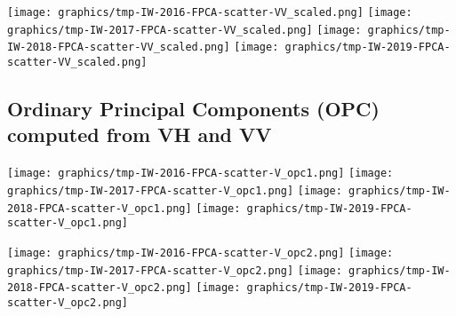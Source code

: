 
\clearpage
\begin{center}
\begin{minipage}{7.0in}
\texttt{[image: graphics/tmp-IW-2016-FPCA-scatter-VV\_scaled.png]}
\quad
\texttt{[image: graphics/tmp-IW-2017-FPCA-scatter-VV\_scaled.png]}
\vskip 1.0cm
\texttt{[image: graphics/tmp-IW-2018-FPCA-scatter-VV\_scaled.png]}
\quad
\texttt{[image: graphics/tmp-IW-2019-FPCA-scatter-VV\_scaled.png]}
\end{minipage}
\end{center}


\clearpage

\subsection{Ordinary Principal Components (OPC) computed from VH and VV}
\label{FPCA-scatter-opc}

\begin{center}
\begin{minipage}{7.0in}
\texttt{[image: graphics/tmp-IW-2016-FPCA-scatter-V\_opc1.png]}
\quad
\texttt{[image: graphics/tmp-IW-2017-FPCA-scatter-V\_opc1.png]}
\vskip 1.0cm
\texttt{[image: graphics/tmp-IW-2018-FPCA-scatter-V\_opc1.png]}
\quad
\texttt{[image: graphics/tmp-IW-2019-FPCA-scatter-V\_opc1.png]}
\end{minipage}
\end{center}


\clearpage
\begin{center}
\begin{minipage}{7.0in}
\texttt{[image: graphics/tmp-IW-2016-FPCA-scatter-V\_opc2.png]}
\quad
\texttt{[image: graphics/tmp-IW-2017-FPCA-scatter-V\_opc2.png]}
\vskip 1.0cm
\texttt{[image: graphics/tmp-IW-2018-FPCA-scatter-V\_opc2.png]}
\quad
\texttt{[image: graphics/tmp-IW-2019-FPCA-scatter-V\_opc2.png]}
\end{minipage}
\end{center}


\clearpage

